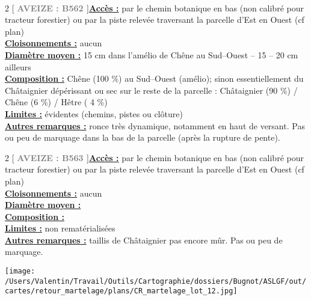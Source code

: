 \documentclass[a4paper,openany]{book}\usepackage[]{graphicx}\usepackage[]{color}
\begin{document}
\\\begin{multicols}{2}
[
\textbf{\textcolor{gray}{
\large AVEIZE : B562
}}
]\noindent\textbf{\underline{Accès :}} par le chemin botanique en bas (non calibré pour tracteur forestier) ou par la piste relevée traversant la parcelle d'Est en Ouest (cf plan)\vspace{0.1cm} \\\noindent\textbf{\underline{Cloisonnements :}} aucun\vspace{0.1cm} \\\noindent\textbf{\underline{Diamètre moyen :}} 15 cm dans l'amélio de Chêne au Sud--Ouest -- 15 -- 20 cm ailleurs\vspace{0.1cm} \\\noindent\textbf{\underline{Composition :}} Chêne (100 \%) au Sud--Ouest (amélio); sinon essentiellement du Châtaignier dépérissant ou sec sur le reste de la parcelle : Châtaignier (90 \%) / Chêne (6 \%) / Hêtre ( 4 \%)\vspace{0.1cm} \\\noindent\textbf{\underline{Limites :}} évidentes (chemins, pistes ou clôture)\vspace{0.1cm} \\\noindent\textbf{\underline{Autres remarques :}} ronce très dynamique, notamment en haut de versant. Pas ou peu de marquage dans la bas de la parcelle (après la rupture de pente).\vspace{0.1cm} \\\end{multicols}\begin{multicols}{2}
[
\textbf{\textcolor{gray}{
\large AVEIZE : B563
}}
]\noindent\textbf{\underline{Accès :}} par le chemin botanique en bas (non calibré pour tracteur forestier) ou par la piste relevée traversant la parcelle d'Est en Ouest (cf plan)\vspace{0.1cm} \\\noindent\textbf{\underline{Cloisonnements :}} aucun\vspace{0.1cm} \\\noindent\textbf{\underline{Diamètre moyen :}} \vspace{0.1cm} \\\noindent\textbf{\underline{Composition :}} \vspace{0.1cm} \\\noindent\textbf{\underline{Limites :}} non rematérialisées\vspace{0.1cm} \\\noindent\textbf{\underline{Autres remarques :}} taillis de Châtaignier pas encore mûr. Pas ou peu de marquage.\vspace{0.1cm} \\\end{multicols}\begin{center}
\texttt{[image: /Users/Valentin/Travail/Outils/Cartographie/dossiers/Bugnot/ASLGF/out/cartes/retour\_martelage/plans/CR\_martelage\_lot\_12.jpg]}
\end{center}\newpage\noindent
\end{document}
